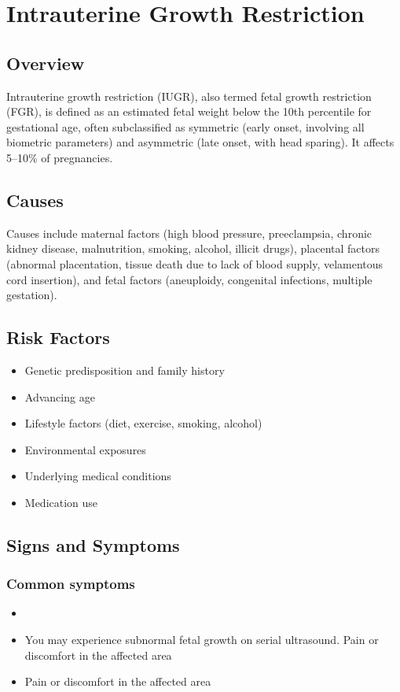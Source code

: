 \chapter{Intrauterine Growth Restriction}
\label{sec:Intrauterine Growth Restriction}

\section{Overview}
Intrauterine growth restriction (IUGR), also termed fetal growth restriction (FGR), is defined as an estimated fetal weight below the 10th percentile for gestational age, often subclassified as symmetric (early onset, involving all biometric parameters) and asymmetric (late onset, with head sparing). It affects 5--10\% of pregnancies.
\section{Causes}
Causes include maternal factors (high blood pressure, preeclampsia, chronic kidney disease, malnutrition, smoking, alcohol, illicit drugs), placental factors (abnormal placentation, tissue death due to lack of blood supply, velamentous cord insertion), and fetal factors (aneuploidy, congenital infections, multiple gestation).     
\section{Risk Factors}

\begin{itemize}[noitemsep]
  \item Genetic predisposition and family history
  \item Advancing age
  \item Lifestyle factors (diet, exercise, smoking, alcohol)
  \item Environmental exposures
  \item Underlying medical conditions
  \item Medication use
\end{itemize}
\section{Signs and Symptoms}

\subsection{Common symptoms}
\begin{itemize}[noitemsep]
  \item \item You may experience subnormal fetal growth on serial ultrasound. Pain or discomfort in the affected area    \item Pain or discomfort in the affected area
  \end{itemize}

